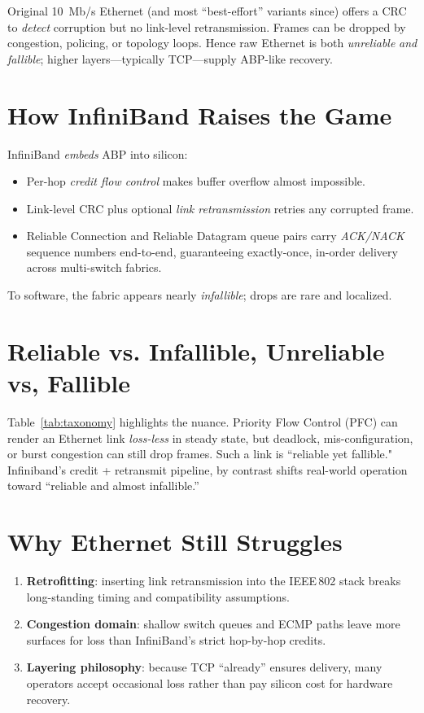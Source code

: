 \documentclass[../main.tex]{subfiles} %
\begin{document}
{{{{{{Original 10~Mb/s Ethernet (and most ``best-effort'' variants since) offers a
CRC to \emph{detect} corruption but no link-level
retransmission. Frames can be dropped by congestion, policing, or topology
loops. Hence raw Ethernet is both \emph{unreliable} \emph{and} \emph{fallible};
higher layers---typically TCP---supply ABP-like recovery.

\section{How InfiniBand Raises the Game}

InfiniBand \emph{embeds} ABP into silicon:

\begin{itemize}
\item Per-hop \emph{credit flow control} makes buffer overflow almost
      impossible.
\item Link-level CRC plus optional \emph{link retransmission} retries any
      corrupted frame.
\item Reliable Connection and Reliable Datagram queue pairs carry
      \emph{ACK/NACK} sequence numbers end-to-end, guaranteeing exactly-once,
      in-order delivery across multi-switch fabrics.
\end{itemize}

To software, the fabric appears nearly \emph{infallible}; drops are rare and localized.

\section{Reliable vs. Infallible, Unreliable vs, Fallible}

Table~\ref{tab:taxonomy} highlights the nuance.  Priority Flow Control (PFC)
can render an Ethernet link \emph{loss-less} in steady state, but deadlock,
mis-configuration, or burst congestion can still drop frames.  Such a link is
``reliable yet fallible." Infiniband's credit + retransmit pipeline, by contrast
shifts real-world operation toward ``reliable and almost infallible.''

\section{Why Ethernet Still Struggles}

\begin{enumerate}
\item \textbf{Retrofitting}: inserting link retransmission into the IEEE\,802
      stack breaks long-standing timing and compatibility assumptions.
\item \textbf{Congestion domain}: shallow switch queues and ECMP paths leave
      more surfaces for loss than InfiniBand’s strict hop-by-hop credits.
\item \textbf{Layering philosophy}: because TCP ``already'' ensures delivery,
      many operators accept occasional loss rather than pay silicon cost for
      hardware recovery.
\end{enumerate}

}}}}}}
\end{document}
